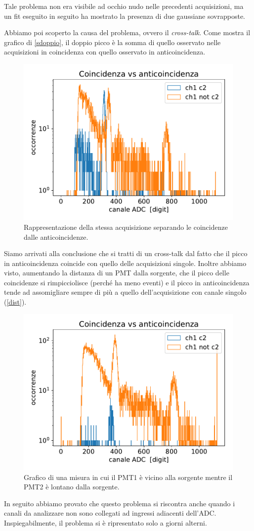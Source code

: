 Tale problema non era visibile ad occhio nudo nelle precedenti acquisizioni, ma un fit eseguito in seguito ha mostrato la presenza di due gaussiane sovrapposte.


Abbiamo poi scoperto la causa del problema, ovvero il \emph{cross-talk}.
Come mostra il grafico di \autoref{sdoppio}, il doppio picco è la somma di quello osservato nelle acquisizioni in coincidenza con quello osservato in anticoincidenza. 

\begin{figure}[h]
\centering
\includegraphics[width=24 em]{immagini/sdoppio}
\caption{Rappresentazione della stessa acquisizione separando le coincidenze dalle anticoincidenze.}
\label{sdoppio}
\end{figure}

Siamo arrivati alla conclusione che si tratti di un cross-talk dal fatto che il picco in anticoincidenza coincide con quello delle acquisizioni singole. Inoltre abbiamo visto, aumentando la distanza di un PMT dalla sorgente, che il picco delle coincidenze si rimpicciolisce (perché ha meno eventi) e il picco in anticoincidenza tende ad assomigliare sempre di più a quello dell'acquisizione con canale singolo (\autoref{dist}).

\begin{figure}[h]
\centering
\includegraphics[width=24 em]{immagini/dist}
\caption{Grafico di una misura in cui il PMT1 è vicino alla sorgente mentre il PMT2 è lontano dalla sorgente.}
\label{dist}
\end{figure}


 In seguito abbiamo provato che questo problema si riscontra anche quando i canali da analizzare non sono collegati ad ingressi adiacenti dell'ADC. Inspiegabilmente, il problema si è ripresentato solo a giorni alterni. 
